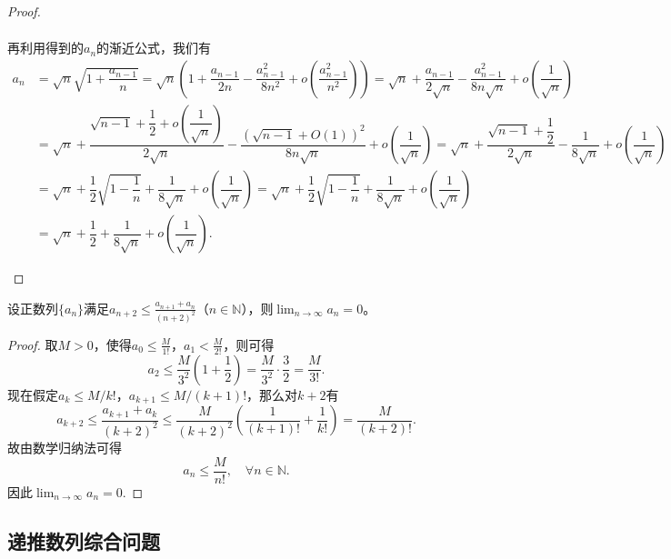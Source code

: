 \documentclass[../../main.tex]{subfiles}%
\begin{document}
\begin{proof}
\begin{enumerate}
\begin{align*}
\end{align*}
再利用得到的$a_n$的渐近公式，我们有
\begin{align*}
a_n &= \sqrt{n}\sqrt{1 + \dfrac{a_{n-1}}{n}} = \sqrt{n}\left( 1 + \dfrac{a_{n-1}}{2n} - \dfrac{a_{n-1}^2}{8n^2} + o\left( \dfrac{a_{n-1}^2}{n^2} \right) \right) = \sqrt{n} + \dfrac{a_{n-1}}{2\sqrt{n}} - \dfrac{a_{n-1}^2}{8n\sqrt{n}} + o\left( \dfrac{1}{\sqrt{n}} \right) \\
&= \sqrt{n} + \dfrac{\sqrt{n - 1} + \dfrac{1}{2} + o\left( \dfrac{1}{\sqrt{n}} \right)}{2\sqrt{n}} - \dfrac{\left( \sqrt{n - 1} + O(1) \right)^2}{8n\sqrt{n}} + o\left( \dfrac{1}{\sqrt{n}} \right) = \sqrt{n} + \dfrac{\sqrt{n - 1} + \dfrac{1}{2}}{2\sqrt{n}} - \dfrac{1}{8\sqrt{n}} + o\left( \dfrac{1}{\sqrt{n}} \right) \\
&= \sqrt{n} + \dfrac{1}{2}\sqrt{1 - \dfrac{1}{n}} + \dfrac{1}{8\sqrt{n}} + o\left( \dfrac{1}{\sqrt{n}} \right) = \sqrt{n} + \dfrac{1}{2}\sqrt{1 - \dfrac{1}{n}} + \dfrac{1}{8\sqrt{n}} + o\left( \dfrac{1}{\sqrt{n}} \right) \\
&= \sqrt{n} + \dfrac{1}{2} + \dfrac{1}{8\sqrt{n}} + o\left( \dfrac{1}{\sqrt{n}} \right).
\end{align*}

\end{enumerate}

\end{proof}

\begin{example}
设正数列\(\{a_n\}\)满足\(a_{n+2} \leqslant \frac{a_{n+1} + a_n}{(n+2)^2}\)（\(n \in \mathbb{N}\)），则\(\lim_{n \to \infty} a_n = 0\)。
\end{example}
\begin{proof}

取\(M > 0\)，使得\(a_0 \leqslant \frac{M}{1!}\)，\(a_1 < \frac{M}{2!}\)，则可得
\[
a_2 \leqslant \frac{M}{3^2}\left(1 + \frac{1}{2}\right) = \frac{M}{3^2} \cdot \frac{3}{2} = \frac{M}{3!}.
\]
现在假定\(a_k \leqslant M/k!\)，\(a_{k+1} \leqslant M/(k+1)!\)，那么对\(k+2\)有
\[
a_{k+2} \leqslant \frac{a_{k+1} + a_k}{(k+2)^2} \leqslant \frac{M}{(k+2)^2}\left( \frac{1}{(k+1)!} + \frac{1}{k!} \right) = \frac{M}{(k+2)!}.
\]
故由数学归纳法可得$$a_n\leqslant \frac{M}{n!},\quad \forall n\in \mathbb{N}.$$
因此\(\lim_{n \to \infty} a_n = 0.\)

\end{proof}


\subsection{递推数列综合问题}
\end{document}
